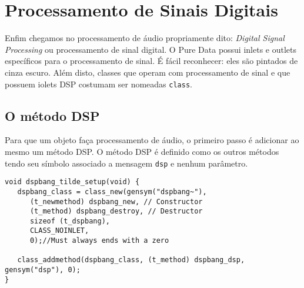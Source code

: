 \chapter{Processamento de Sinais Digitais}


Enfim chegamos no processamento de áudio propriamente dito: \emph{Digital
Signal Processing} ou processamento de sinal digital.
O Pure Data possui inlets e outlets específicos para o processamento de sinal.
É fácil reconhecer: eles são pintados de cinza escuro.
Além disto, classes que operam com processamento de sinal e que possuem iolets
DSP costumam ser nomeadas \texttt{class\til}.


\section{O método DSP}

Para que um objeto faça processamento de áudio, o primeiro passo é adicionar ao
mesmo um método DSP.
O método DSP é definido como os outros métodos tendo seu símbolo associado a
mensagem \texttt{dsp} e nenhum parâmetro.

\begin{lstlisting}[caption=Adicionando um método para DSP]
void dspbang_tilde_setup(void) {
   dspbang_class = class_new(gensym("dspbang~"),
      (t_newmethod) dspbang_new, // Constructor
      (t_method) dspbang_destroy, // Destructor
      sizeof (t_dspbang),
      CLASS_NOINLET,
      0);//Must always ends with a zero

   class_addmethod(dspbang_class, (t_method) dspbang_dsp, gensym("dsp"), 0);
}
\end{lstlisting}


